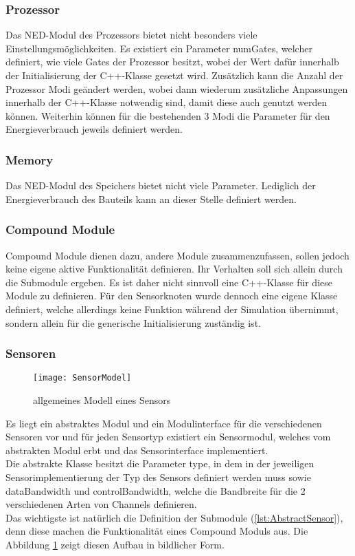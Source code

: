 \subsubsection{Prozessor}

Das NED-Modul des Prozessors bietet nicht besonders viele Einstellungsmöglichkeiten. Es existiert ein Parameter numGates, welcher definiert, wie viele Gates der Prozessor besitzt, wobei der Wert dafür innerhalb der Initialisierung der C++-Klasse gesetzt wird. Zusätzlich kann die Anzahl der Prozessor Modi geändert werden, wobei dann wiederum zusätzliche Anpassungen innerhalb der C++-Klasse notwendig sind, damit diese auch genutzt werden können. Weiterhin können für die bestehenden 3 Modi die Parameter für den Energieverbrauch jeweils definiert werden.

\subsubsection{Memory}

Das NED-Modul des Speichers bietet nicht viele Parameter. Lediglich der Energieverbrauch des Bauteils kann an dieser Stelle definiert werden.

\subsubsection{Compound Module}

Compound Module dienen dazu, andere Module zusammenzufassen, sollen jedoch keine eigene aktive Funktionalität definieren. Ihr Verhalten soll sich allein durch die Submodule ergeben. Es ist daher nicht sinnvoll eine C++-Klasse für diese Module zu definieren.\newline
Für den Sensorknoten wurde dennoch eine eigene Klasse definiert, welche allerdings keine Funktion während der Simulation übernimmt, sondern allein für die generische Initialisierung zuständig ist.

\subsubsection{Sensoren}

\begin{figure}[htbp]
\centering
\caption{allgemeines Modell eines Sensors}
\label{fig:SensorModel}
\texttt{[image: SensorModel]}
\end{figure}

Es liegt ein abstraktes Modul und ein Modulinterface für die verschiedenen Sensoren vor und für jeden Sensortyp existiert ein Sensormodul, welches vom abstrakten Modul erbt und das Sensorinterface implementiert.\\
Die abstrakte Klasse besitzt die Parameter type, in dem in der jeweiligen Sensorimplementierung der Typ des Sensors definiert werden muss sowie dataBandwidth und controlBandwidth, welche die Bandbreite für die 2 verschiedenen Arten von Channels definieren.\\
Das wichtigste ist natürlich die Definition der Submodule (\ref{lst:AbstractSensor}), denn diese machen die Funktionalität eines Compound Moduls aus. Die Abbildung \ref{fig:SensorModel} zeigt diesen Aufbau in bildlicher Form.

